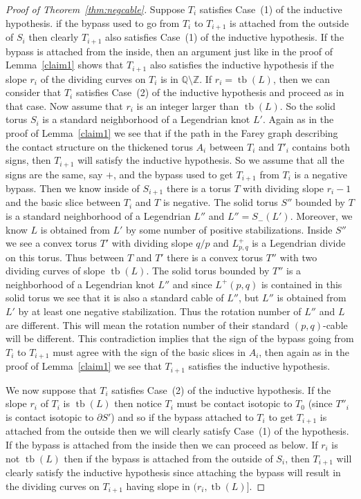 \documentclass[11pt]{amsart}
\theoremstyle{plain}
\theoremstyle{definition}
\theoremstyle{remark}
\numberwithin{theorem}{section}
\newcommand{\Q}{\mathbb{Q}}           %
\newcommand{\Z}{\mathbb{Z}}           %
\DeclareMathOperator\tb{tb}                   %
\begin{document}
\begin{proof}[Proof of Theorem~\ref{thm:negcable}]
Suppose $T_i$ satisfies Case~(1) of the inductive hypothesis. if the bypass used to go from $T_i$ to $T_{i+1}$ is attached from the outside of $S_i$ then clearly $T_{i+1}$ also satisfies Case~(1) of the inductive hypothesis. If the bypass is attached from the inside, then an argument just like in the proof of Lemma~\ref{claim1} shows that $T_{i+1}$ also satisfies the inductive hypothesis if the slope $r_i$ of the dividing curves on $T_i$ is in $\Q\setminus \Z$. If $r_i=\tb(L)$, then we can consider that $T_i$ satisfies Case~(2) of the inductive hypothesis and proceed as in that case. Now assume that $r_i$ is an integer larger than $\tb(L)$. So the solid torus $S_i$ is a standard neighborhood of a Legendrian knot $L'$.  Again as in the proof of Lemma~\ref{claim1} we see that if the path in the Farey graph describing the contact structure on the thickened torus $A_i$ between $T_i$ and $T'_i$ contains both signs, then $T_{i+1}$ will satisfy the inductive hypothesis. So we assume that all the signs are the same, say $+$, and the bypass used to get $T_{i+1}$ from $T_i$ is a negative bypass. Then we know inside of $S_{i+1}$ there is a torus $T$ with dividing slope $r_i-1$ and the basic slice between $T_i$ and $T$ is negative. The solid torus $S''$ bounded by $T$ is a standard neighborhood of a Legendrian $L''$ and $L''=S_-(L')$. Moreover, we know $L$ is obtained from $L'$ by some number of positive stabilizations. Inside $S''$ we see a convex torus $T'$ with dividing slope $q/p$ and $L^+_{p,q}$ is a Legendrian divide on this torus. Thus between $T$ and $T'$ there is a convex torus $T''$ with two dividing curves of slope $\tb(L)$. The solid torus bounded by $T''$ is a neighborhood of a Legendrian knot $L''$ and since $L^+(p,q)$ is contained in this solid torus we see that it is also a standard cable of $L''$, but $L''$ is obtained from $L'$ by at least one negative stabilization. Thus the rotation number of $L''$ and $L$ are different. This will mean the rotation number of their standard $(p,q)$-cable will be different. This contradiction implies that the sign of the bypass going from $T_i$ to $T_{i+1}$ must agree with the sign of the basic slices in $A_i$, then again as in the proof of Lemma~\ref{claim1} we see that $T_{i+1}$ satisfies the inductive hypothesis. 

We now suppose that $T_i$ satisfies Case~(2) of the inductive hypothesis. If the slope $r_i$ of $T_i$ is $\tb(L)$ then notice $T_i$ must be contact isotopic to $T_0$  (since $T''_i$ is contact isotopic to $\partial S'$) and so if the bypass attached to $T_i$ to get $T_{i+1}$ is attached from the outside then we will clearly satisfy Case~(1) of the hypothesis. If the bypass is attached from the inside then we can proceed as below. 
If $r_i$ is not $\tb(L)$ then if the bypass is attached from the outside of $S_i$, then $T_{i+1}$ will clearly satisfy the inductive hypothesis since attaching the bypass will result in the dividing curves on $T_{i+1}$ having slope in $(r_i, \tb(L)]$. 


\end{proof}
\end{document}
